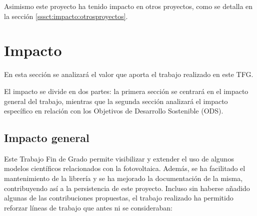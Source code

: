Asimismo este proyecto ha tenido impacto en otros proyectos, como se detalla en la sección \ref{sssct:impacto:otrosproyectos}.

\section{Impacto} \label{chp:impacto}

En esta sección se analizará el valor que aporta el trabajo realizado en este TFG.

El impacto se divide en dos partes: la primera sección se centrará en el impacto general del trabajo, mientras que la segunda sección analizará el impacto específico en relación con los Objetivos de Desarrollo Sostenible (ODS).


\subsection{Impacto general} \label{sssct:impacto:general}

Este Trabajo Fin de Grado permite visibilizar y extender el uso de algunos modelos científicos relacionados con la fotovoltaica. Además, se ha facilitado el mantenimiento de la librería \pvlibpy{} y se ha mejorado la documentación de la misma, contribuyendo así a la persistencia de este proyecto. Incluso sin haberse añadido algunas de las contribuciones propuestas, el trabajo realizado ha permitido reforzar líneas de trabajo que antes ni se consideraban:

